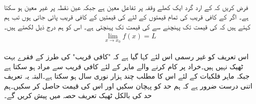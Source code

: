 \\
فرض کریں کہ  کے ارد گرد  ایک کھلے وقفہ پر تفاعل  معین ہے جبکہ عین نقطہ  پر  غیر معین ہو سکتا ہے۔ اگر  کے کافی قریب  کی  تمام قیمتوں کے لئے  کی قیمتیں  کے کافی قریب پائی جاتی ہوں تب ہم کہتے ہیں کہ  کی قیمت  تک پہنچنے سے  کی قیمت   تک پہنچتی ہے۔ اس کو ہم درج ذیل لکھتے ہیں۔
\begin{align*}
\lim_{x\to x_0} f(x)=L
\end{align*}

اس تعریف کو غیر رسمی اس لئے کہا گیا ہے کہ "کافی قریب" کی طرز کے فقرے بہت ٹھیک نہیں ہیں۔خراد پر کام کرنے والے ماہر کے لئے کافی قریب سے مراد  ہو سکتا ہے جبکہ ماہر فلکیات کے لئے اس کا مطلب چند ہزار نوری سال ہو سکتا ہے۔البتہ یہ تعریف اتنی درست ضرور ہے کہ ہم حد کو پہچان سکیں اور اس کی قیمت حاصل کر سکیں۔ہم حد کی بالکل ٹھیک تعریف حصہ  میں  پیش کریں گے۔

